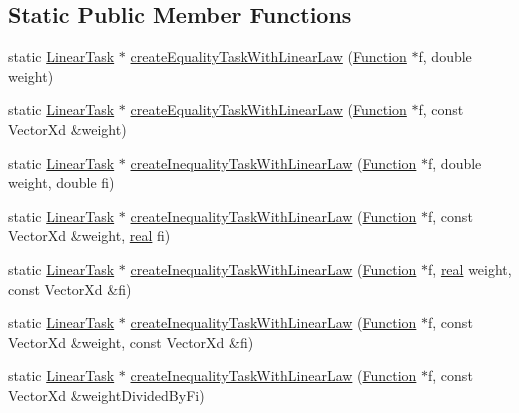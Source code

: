 \subsection*{Static Public Member Functions}
\begin{DoxyCompactItemize}
\item 
static \hyperlink{classocra_1_1LinearTask}{Linear\+Task} $\ast$ \hyperlink{classocra_1_1LinearTask_a566facd954e4cdedb6d28cf6acd81a0f}{create\+Equality\+Task\+With\+Linear\+Law} (\hyperlink{classocra_1_1Function}{Function} $\ast$f, double weight)
\item 
static \hyperlink{classocra_1_1LinearTask}{Linear\+Task} $\ast$ \hyperlink{classocra_1_1LinearTask_a0e046c85faf7845383754ff76eb98577}{create\+Equality\+Task\+With\+Linear\+Law} (\hyperlink{classocra_1_1Function}{Function} $\ast$f, const Vector\+Xd \&weight)
\item 
static \hyperlink{classocra_1_1LinearTask}{Linear\+Task} $\ast$ \hyperlink{classocra_1_1LinearTask_a27f3ec57a7987a304f6fa3459bbb1471}{create\+Inequality\+Task\+With\+Linear\+Law} (\hyperlink{classocra_1_1Function}{Function} $\ast$f, double weight, double fi)
\item 
static \hyperlink{classocra_1_1LinearTask}{Linear\+Task} $\ast$ \hyperlink{classocra_1_1LinearTask_acdc8fcd9fb536eadb6713a6ed7104b0d}{create\+Inequality\+Task\+With\+Linear\+Law} (\hyperlink{classocra_1_1Function}{Function} $\ast$f, const Vector\+Xd \&weight, \hyperlink{namespaceocra_af4478308ca113669e67d72f9a3050469}{real} fi)
\item 
static \hyperlink{classocra_1_1LinearTask}{Linear\+Task} $\ast$ \hyperlink{classocra_1_1LinearTask_a22fa8cb968410219ffe92a90f4d4cd0f}{create\+Inequality\+Task\+With\+Linear\+Law} (\hyperlink{classocra_1_1Function}{Function} $\ast$f, \hyperlink{namespaceocra_af4478308ca113669e67d72f9a3050469}{real} weight, const Vector\+Xd \&fi)
\item 
static \hyperlink{classocra_1_1LinearTask}{Linear\+Task} $\ast$ \hyperlink{classocra_1_1LinearTask_afe1724e6fe71b6d2e1dd7fe1cae882be}{create\+Inequality\+Task\+With\+Linear\+Law} (\hyperlink{classocra_1_1Function}{Function} $\ast$f, const Vector\+Xd \&weight, const Vector\+Xd \&fi)
\item 
static \hyperlink{classocra_1_1LinearTask}{Linear\+Task} $\ast$ \hyperlink{classocra_1_1LinearTask_af62a910012dbcd7583ac0e9536899836}{create\+Inequality\+Task\+With\+Linear\+Law} (\hyperlink{classocra_1_1Function}{Function} $\ast$f, const Vector\+Xd \&weight\+Divided\+By\+Fi)
\end{DoxyCompactItemize}
